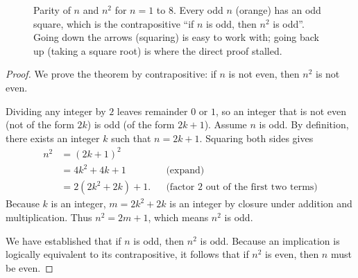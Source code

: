 \begin{figure}[htbp]
\centering
{}
\caption{Parity of $n$ and $n^2$ for $n = 1$ to $8$. Every odd $n$ (orange) has an odd square, which is the contrapositive ``if $n$ is odd, then $n^2$ is odd''. Going down the arrows (squaring) is easy to work with; going back up (taking a square root) is where the direct proof stalled.}
\label{07:fig-parity-squares}
\end{figure}

\begin{proof}
We prove the theorem by contrapositive: if $n$ is not even, then $n^2$ is not even.

Dividing any integer by $2$ leaves remainder $0$ or $1$, so an integer that is not even (not of the form $2k$) is odd (of the form $2k + 1$). Assume $n$ is odd. By definition, there exists an integer $k$ such that $n = 2k + 1$. Squaring both sides gives
\begin{align*}
n^2 &= (2k + 1)^2\\
&= 4k^2 + 4k + 1 && \text{(expand)}\\
&= 2(2k^2 + 2k) + 1. && \text{(factor } 2 \text{ out of the first two terms)}
\end{align*}
Because $k$ is an integer, $m = 2k^2 + 2k$ is an integer by closure under addition and multiplication. Thus $n^2 = 2m + 1$, which means $n^2$ is odd.

We have established that if $n$ is odd, then $n^2$ is odd. Because an implication is logically equivalent to its contrapositive, it follows that if $n^2$ is even, then $n$ must be even.
\end{proof}

